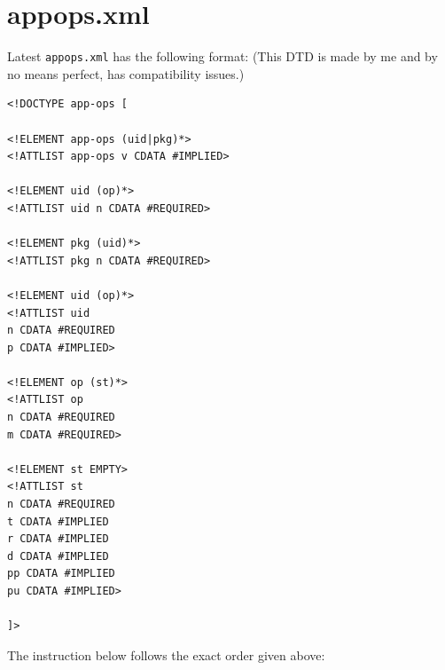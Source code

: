 \section{appops.xml}\label{sec:appops-xml} %
Latest \texttt{appops.xml} has the following format: (This DTD is made by me and by no means perfect, has compatibility issues.)

\begin{Verbatim}
<!DOCTYPE app-ops [

<!ELEMENT app-ops (uid|pkg)*>
<!ATTLIST app-ops v CDATA #IMPLIED>

<!ELEMENT uid (op)*>
<!ATTLIST uid n CDATA #REQUIRED>

<!ELEMENT pkg (uid)*>
<!ATTLIST pkg n CDATA #REQUIRED>

<!ELEMENT uid (op)*>
<!ATTLIST uid
n CDATA #REQUIRED
p CDATA #IMPLIED>

<!ELEMENT op (st)*>
<!ATTLIST op
n CDATA #REQUIRED
m CDATA #REQUIRED>

<!ELEMENT st EMPTY>
<!ATTLIST st
n CDATA #REQUIRED
t CDATA #IMPLIED
r CDATA #IMPLIED
d CDATA #IMPLIED
pp CDATA #IMPLIED
pu CDATA #IMPLIED>

]>
\end{Verbatim}
The instruction below follows the exact order given above:
